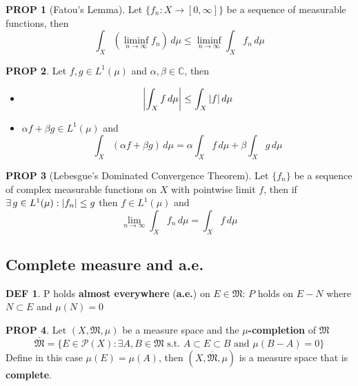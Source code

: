 \documentclass[hidelinks,10pt]{article}
\theoremstyle{definition}
\newtheorem*{defin}{DEF}
\theoremstyle{dotles}
\theoremstyle{dotless}
\newtheorem{proposition}{PROP}[section]
\theoremstyle{remark}
\begin{document}
\begin{proposition}[Fatou's Lemma]
Let $\{f_n:X\to[0,\infty]\}$ be a sequence of measurable functions, then
\[\int_X(\liminf_{n\to\infty}f_n)\,d\mu\leq\liminf_{n\to\infty}\int_Xf_n\,d\mu\]
\end{proposition}

\begin{proposition}
Let $f,g\in L^1(\mu)$ and $\alpha,\beta\in\mathbb{C}$, then\begin{itemize}
    \item \[\abs{\int_Xf\,d\mu}\leq\int_X\abs{f}\,d\mu\]
    \item $\alpha f+\beta g\in L^1(\mu)$ and
    \[\int_X(\alpha f+\beta g)\,d\mu=\alpha\int_Xf\,d\mu+\beta\int_Xg\,d\mu\]
\end{itemize}
\end{proposition}

\begin{proposition}[Lebesgue's Dominated Convergence Theorem]
Let $\{f_n\}$ be a sequence of complex measurable functions on $X$ with pointwise limit $f$, then if $\exists\,g\in L^1(\mu):\abs{f_n}\leq g$ then $f\in L^1(\mu)$ and
\[\lim_{n\to\infty}\int_Xf_n\,d\mu=\int_Xf\,d\mu\]
\end{proposition}

\subsection{Complete measure and a.e.}

\begin{defin}
P holds \textbf{almost everywhere} (\textbf{a.e.}) on $E\in\mathfrak{M}$: $P$ holds on $E-N$ where $N\subset E$ and $\mu(N)=0$
\end{defin}

\begin{proposition}
Let $(X,\mathfrak{M},\mu)$ be a measure space and the \textbf{$\mu$-completion} of $\mathfrak{M}$
\[\overline{\mathfrak{M}}=\{E\in\mathscr{P}(X):\exists A,B\in\mathfrak{M}\textrm{ s.t. }A\subset E\subset B\textrm{ and }\mu(B-A)=0\}\]
Define in this case $\mu(E)=\mu(A)$, then $(X,\overline{\mathfrak{M}},\mu)$ is a measure space that is \textbf{complete}.
\end{proposition}
\end{document}

